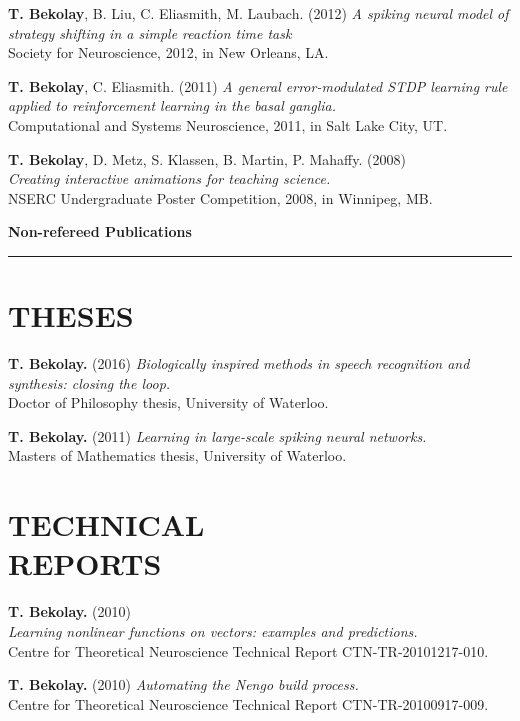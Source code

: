 \documentclass[line,margin]{res}
\begin{document}
\begin{resume}
\textbf{T. Bekolay}, B. Liu, C. Eliasmith, M. Laubach. (2012)
  {\sl A spiking neural model of strategy shifting in a simple
  reaction time task} \\
  Society for Neuroscience, 2012, in New Orleans, LA.

\textbf{T. Bekolay}, C. Eliasmith. (2011)
  {\sl A general error-modulated STDP learning rule applied to
  reinforcement learning in the basal ganglia.} \\
  Computational and Systems Neuroscience, 2011, in Salt Lake City, UT.

\textbf{T. Bekolay}, D. Metz, S. Klassen, B. Martin, P. Mahaffy. (2008) \\
  {\sl Creating interactive animations for teaching science.} \\
  NSERC Undergraduate Poster Competition, 2008, in Winnipeg, MB.
  \vspace{0.42em}

{\Large \bf Non-refereed Publications} \\ \vspace{-8pt} \hrule

\section{THESES}

\textbf{T. Bekolay.} (2016)
  {\sl Biologically inspired methods in speech recognition and synthesis:
  closing the loop.} \\
  Doctor of Philosophy thesis, University of Waterloo.

\textbf{T. Bekolay.} (2011)
  {\sl Learning in large-scale spiking neural networks.} \\
  Masters of Mathematics thesis, University of Waterloo.

\section{TECHNICAL \\REPORTS}

\textbf{T. Bekolay.} (2010) \\
  {\sl Learning nonlinear functions on vectors: examples and predictions.} \\
  Centre for Theoretical Neuroscience Technical Report CTN-TR-20101217-010.

\textbf{T. Bekolay.} (2010)
  {\sl Automating the Nengo build process.} \\
  Centre for Theoretical Neuroscience Technical Report CTN-TR-20100917-009.


\end{resume}
\end{document}
